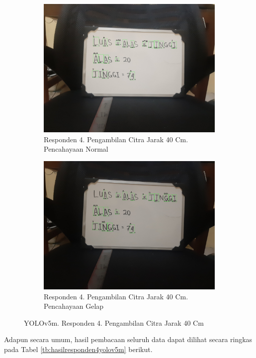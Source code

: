 \begin{figure}[H]
  \begin{subfigure}{.5\textwidth}
    \centering
    \captionsetup{width=.8\linewidth}
    \includegraphics[width=.8\linewidth]{gambar/yolov5m/responden4/hakimaxt40cm00-result.jpg}
    \caption{Responden 4. Pengambilan Citra Jarak 40 Cm. Pencahayaan Normal}
    \label{fig:mr4tcitra40cm}
  \end{subfigure}%
  \begin{subfigure}{.5\textwidth}
    \centering
    \captionsetup{width=.8\linewidth}
    \includegraphics[width=.8\linewidth]{gambar/yolov5m/responden4/hakimaxt40cm10-result.jpg}
    \caption{Responden 4. Pengambilan Citra Jarak 40 Cm. Pencahayaan Gelap}
    \label{fig:mr4gcitra40cm}
  \end{subfigure}
  \caption{YOLOv5m. Responden 4. Pengambilan Citra Jarak 40 Cm}
  \label{fig:mr4citra40cm}
\end{figure}


Adapun secara umum, hasil pembacaan seluruh data dapat dilihat secara ringkas pada Tabel \ref*{tb:hasilresponden4yolov5m} berikut.

